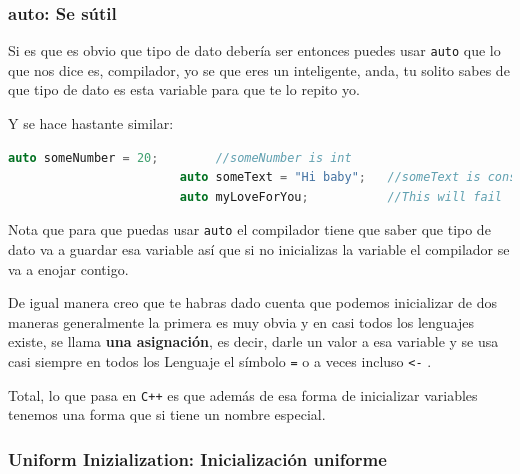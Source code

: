 \documentclass[12pt, fleqn]{report}                             %
\theoremstyle{break}                                            %
\newcommand{\textCode}[1]  { \texttt{#1} }                      %
\newcommand \Cpp  {\textCode{C++} }                               %
\begin{document}
                \subsubsection{auto: Se sútil}

                    Si es que es obvio que tipo de dato debería ser entonces puedes usar \textCode{auto}
                    que lo que nos dice es, compilador, yo se que eres un inteligente, anda, 
                    tu solito sabes de que tipo de dato es esta variable para que te lo repito yo.
                    
                    Y se hace hastante similar:
                    \begin{lstlisting}[language=C++, gobble=24]
                        auto someNumber = 20;        //someNumber is int
                        auto someText = "Hi baby";   //someText is const char* (this is sad)
                        auto myLoveForYou;           //This will fail
                    \end{lstlisting}

                    Nota que para que puedas usar \textCode{auto} el compilador tiene que saber que tipo
                    de dato va a guardar esa variable así que si no inicializas la variable 
                    el compilador se va a enojar contigo.

                    De igual manera creo que te habras dado cuenta que podemos inicializar de dos maneras
                    generalmente la primera es muy obvia y en casi todos los lenguajes existe, se llama
                    \textbf{una asignación}, es decir, darle un valor a esa variable y se usa casi siempre en
                    todos los Lenguaje el símbolo \textCode{=} o a veces incluso \textCode{<-}.

                    Total, lo que pasa en \Cpp es que además de esa forma de inicializar variables tenemos
                    una forma que si tiene un nombre especial.

                \subsubsection{Uniform Inizialization: Inicialización uniforme}
\end{document}
